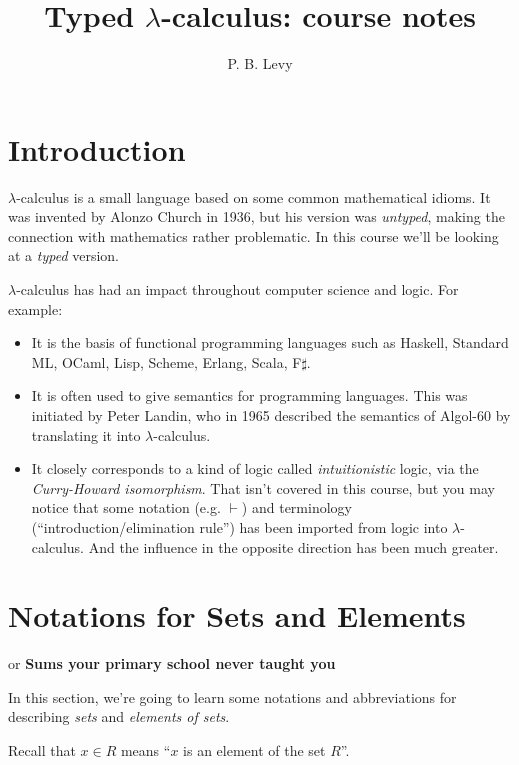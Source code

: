 \documentclass[runningheads,12pt]{llncs}
\title{Typed $\lambda$-calculus: course notes}
\author{P. B.  Levy}
\institute{University of Birmingham}
\begin{document}
\maketitle

\section{Introduction}
 
$\lambda$-calculus is a small language based on some common mathematical idioms.  It was invented by Alonzo Church in 1936, but his version was \emph{untyped}, making the connection with mathematics rather problematic.  In this course we'll be looking at a \emph{typed} version.

$\lambda$-calculus has had an impact throughout computer science and logic.  For example:
\begin{itemize}
\item It is the basis of functional programming languages such as Haskell, Standard ML, OCaml, Lisp, Scheme, Erlang, Scala, F$\sharp$.
\item It is often used to give semantics for programming languages.   This was initiated by Peter Landin, who in 1965 described the semantics of Algol-60 by translating it into $\lambda$-calculus.
\item It closely corresponds to a kind of logic called \emph{intuitionistic} logic, via the \emph{Curry-Howard isomorphism}.  That isn't covered in this course, but you may notice that some notation (e.g. $\vdash$) and terminology (``introduction/elimination rule'') has been imported from logic into $\lambda$-calculus.  And the influence in the opposite direction has been much greater.
\end{itemize}


\section{Notations for Sets and Elements }

\noindent or {\bf Sums your primary school never taught you} 

In this section, we're going to learn some notations and abbreviations for describing \emph{sets} and \emph{elements of sets}.  

Recall that $x \in R$ means ``$x$ is an element of the set $R$''.
\end{document}
